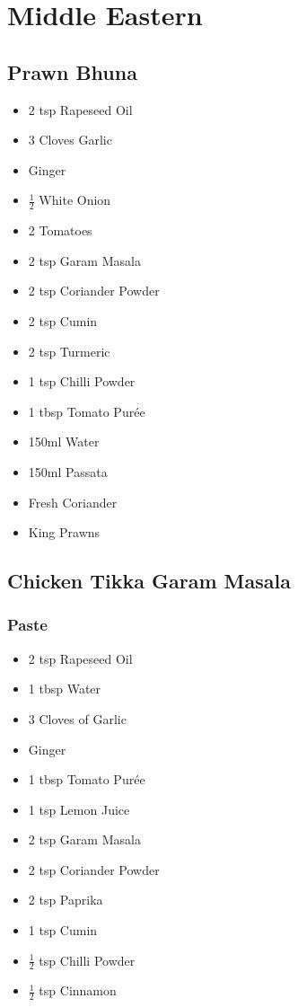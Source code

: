 \documentclass[11pt, english]{article}
\begin{document}
\newpage

\section{Middle Eastern}

	\subsection{Prawn Bhuna}

	\begin{itemize}
        \setlength\itemsep{0cm}
                \item 2 tsp Rapeseed Oil
		\item 3 Cloves Garlic
		\item Ginger
		\item $\frac{1}{2}$ White Onion
		\item 2 Tomatoes
		\item 2 tsp Garam Masala
		\item 2 tsp Coriander Powder
		\item 2 tsp Cumin
		\item 2 tsp Turmeric
		\item 1 tsp Chilli Powder
		\item 1 tbsp Tomato Pur\'{e}e
		\item 150ml Water
		\item 150ml Passata
		\item Fresh Coriander
		\item King Prawns
        \end{itemize}

\newpage

	\subsection{Chicken Tikka Garam Masala}

		\subsubsection*{Paste}

	\begin{itemize}
        \setlength\itemsep{0cm}
                \item 2 tsp Rapeseed Oil
		\item 1 tbsp Water
		\item 3 Cloves of Garlic
		\item Ginger
		\item 1 tbsp Tomato Pur\'{e}e
		\item 1 tsp Lemon Juice
		\item 2 tsp Garam Masala
		\item 2 tsp Coriander Powder
		\item 2 tsp Paprika
		\item 1 tsp Cumin
		\item $\frac{1}{2}$ tsp Chilli Powder
		\item $\frac{1}{2}$ tsp Cinnamon
        \end{itemize}
\end{document}
